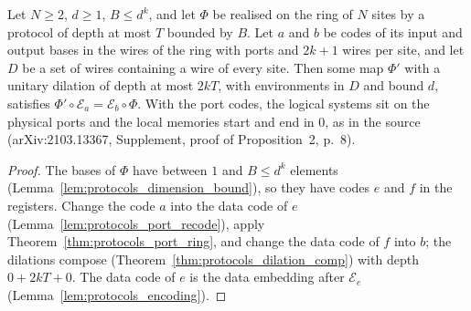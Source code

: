 \begin{theorem}
    \label{thm:protocols_port_code}
    \leanok
    Let $N\ge2$, $d\ge1$, $B\le d^k$, and let $\Phi$ be realised on the ring of $N$ sites by a
    protocol of depth at most $T$ bounded by $B$. Let $a$ and $b$ be codes of its input and
    output bases in the wires of the ring with ports and $2k+1$ wires per site, and let $D$ be
    a set of wires containing a wire of every site. Then some map $\Phi'$ with a unitary
    dilation of depth at most $2kT$, with environments in $D$ and bound $d$, satisfies
    $\Phi'\circ\mathcal E_a=\mathcal E_b\circ\Phi$. With the port codes, the logical systems sit
    on the physical ports and the local memories start and end in $0$, as in the source
    (arXiv:2103.13367, Supplement, proof of Proposition~2, p.~8).
\end{theorem}
\begin{proof}\leanok
    The bases of $\Phi$ have between $1$ and $B\le d^k$ elements
    (Lemma~\ref{lem:protocols_dimension_bound}), so they have codes $e$ and $f$ in the
    registers. Change the code $a$ into the data code of $e$
    (Lemma~\ref{lem:protocols_port_recode}), apply Theorem~\ref{thm:protocols_port_ring}, and
    change the data code of $f$ into $b$; the dilations compose
    (Theorem~\ref{thm:protocols_dilation_comp}) with depth $0+2kT+0$. The data code of $e$ is
    the data embedding after $\mathcal E_e$ (Lemma~\ref{lem:protocols_encoding}).
\end{proof}

